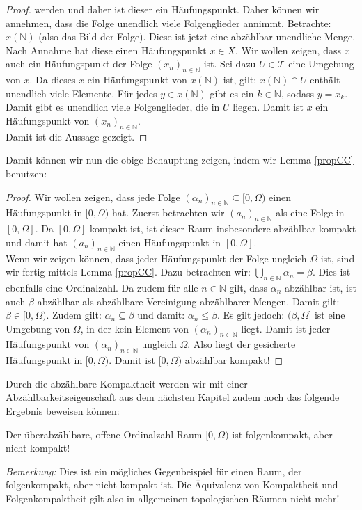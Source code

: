 \documentclass[11pt]{scrartcl}
\begin{document}
\begin{proof}
	werden und daher ist dieser ein Häufungspunkt. Daher können wir annehmen, dass die Folge unendlich viele Folgenglieder annimmt. Betrachte: $x(\mathbb N)$ (also das Bild der Folge). Diese ist 
	jetzt eine abzählbar unendliche Menge. Nach Annahme hat diese einen Häufungspunkt $x\in X$. Wir wollen zeigen, dass $x$ auch ein Häufungspunkt der Folge $(x_n)_{n\in\mathbb N}$ ist. Sei dazu $U \in
	\mathcal T$ eine Umgebung von $x$. Da dieses $x$ ein Häufungspunkt von $x(\mathbb N)$ ist, gilt: $x(\mathbb N) \cap U$ enthält unendlich viele Elemente. Für jedes $y \in x(\mathbb N)$ gibt es ein
	$k\in\mathbb N$, sodass $y=x_k$. Damit gibt es unendlich viele Folgenglieder, die in $U$ liegen. Damit ist $x$ ein Häufungspunkt von $(x_n)_{n\in\mathbb N}$.\\
	Damit ist die Aussage gezeigt.
\end{proof}
\noindent Damit können wir nun die obige Behauptung zeigen, indem wir Lemma \ref{propCC} benutzen:
\begin{proof}
	Wir wollen zeigen, dass jede Folge $(\alpha_n)_{n\in\mathbb N} \subseteq [0,\Omega)$ einen 
	Häufungspunkt in $[0,\Omega)$ hat. Zuerst betrachten wir $(a_n)_{n\in\mathbb N}$ als eine Folge
	in $[0,\Omega]$. Da $[0,\Omega]$ kompakt ist, ist dieser Raum insbesondere abzählbar kompakt und
	damit hat $(a_n)_{n\in\mathbb N}$ einen Häufungspunkt in $[0,\Omega]$.\\
	Wenn wir zeigen können, dass jeder Häufungspunkt der Folge ungleich $\Omega$ ist, sind wir
	fertig mittels Lemma \ref{propCC}. Dazu betrachten wir: $\bigcup_{n\in\mathbb N} \alpha_n = \beta$. Dies
	ist ebenfalls eine Ordinalzahl. Da zudem für alle $n\in\mathbb N$ gilt, dass $\alpha_n$ 
	abzählbar ist, ist auch $\beta$ abzählbar als abzählbare Vereinigung abzählbarer Mengen. Damit 
	gilt: $\beta \in [0, \Omega)$. Zudem gilt: $\alpha_n \subseteq \beta$ und damit: $\alpha_n\leq 
	\beta$. Es gilt jedoch: $(\beta,\Omega]$ ist eine Umgebung von $\Omega$, in der kein Element von 
	$(\alpha_n)_{n\in\mathbb N}$ liegt. Damit ist jeder Häufungspunkt von $(\alpha_n)_{n\in\mathbb N}
	$ ungleich $\Omega$. Also liegt der gesicherte Häufungspunkt in $[0,\Omega)$. Damit ist
	$[0,\Omega)$ abzählbar kompakt!
\end{proof}
\noindent Durch die abzählbare Kompaktheit werden wir mit einer Abzählbarkeitseigenschaft aus dem nächsten Kapitel zudem noch das folgende Ergebnis beweisen können:
\begin{theorem}\label{UOOSisSQNotC}
	Der überabzählbare, offene Ordinalzahl-Raum $[0,\Omega)$ ist folgenkompakt, aber nicht kompakt!
\end{theorem}
\textit{Bemerkung:} Dies ist ein mögliches Gegenbeispiel für einen Raum, der folgenkompakt, aber nicht kompakt ist. Die Äquivalenz von Kompaktheit und Folgenkompaktheit gilt also in allgemeinen topologischen Räumen nicht mehr!
\end{document}
